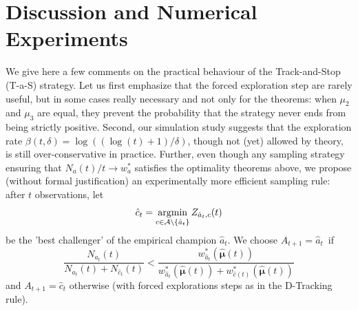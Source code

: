 \documentclass{colt2016} %
\begin{document}
\section{Discussion and Numerical Experiments}\label{sec:experiments}
We give here a few comments on the practical behaviour of the Track-and-Stop (T-a-S) strategy.
Let us first emphasize that the forced exploration step are rarely useful, but in some cases really necessary and not only for the theorems: when $\mu_2$ and $\mu_3$ are equal, they prevent the probability that the strategy never ends from being strictly positive. 
Second, our simulation study suggests that the exploration rate $\beta(t,\delta)=\log((\log(t)+1)/\delta)$, though not (yet) allowed by theory, is still over-conservative in practice. Further, even though any sampling strategy ensuring that $N_a(t) / t \to w_a^*$  satisfies the optimality theorems above, we propose (without formal justification) an experimentally more efficient sampling rule: after $t$ observations, let 
\[\hat{c}_t = \underset{c\in\mathcal{A}\setminus\{\hat{a}_t\}}{\text{argmin}} \,  Z_{\hat{a}_t,c}(t) \] %
be the  'best challenger' of the empirical champion $\hat{a}_t$. %
 We choose $A_{t+1} = \hat{a}_t$~if 
\[\frac{N_{\hat{a}_t}(t)}{N_{\hat{a}_t}(t) + N_{\hat{c}_t}(t)} < \frac{w_{\hat{a}_t}^*(\hat{\bm \mu}(t))}{w_{\hat{a}_t}^*(\hat{\bm \mu}(t))+w_{\hat{c}(t)}^*(\hat{\bm \mu}(t))}\]
and $A_{t+1} = \hat{c}_t$ otherwise (with forced explorations steps as in the D-Tracking rule).
\end{document}
